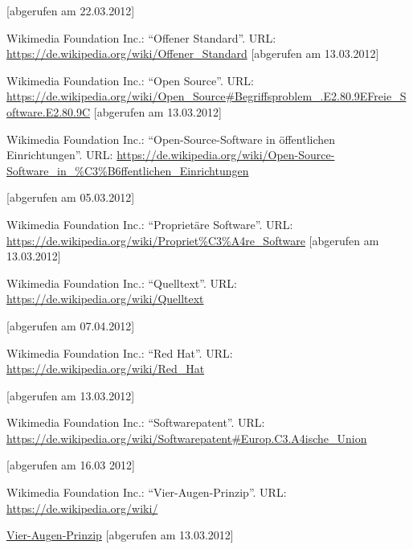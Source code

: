 \documentclass[a4paper]{scrartcl}
\begin{document}
{
{{[abgerufen am 22.03.2012]}}}

{
{{Wikimedia Foundation Inc.:
``Offener Standard''.
URL:}}{{{
}}}\url{https://de.wikipedia.org/wiki/Offener_Standard}{{
}}{[abgerufen am 13.03.2012]}}

{
{{Wikimedia Foundation Inc.:
``Open Source''. URL:
}}\href{https://de.wikipedia.org/wiki/Open_Source#Begriffsproblem_.E2.80.9EFreie_Software.E2.80.9C
}{{https://de.wikipedia.org/wiki/Open\_Source\#Begriffsproblem\_.E2.80.9EFreie\_Software.E2.80.9C}}{{
[abgerufen am 13.03.2012]}}}

{
{{Wikimedia Foundation Inc.:
``Open-Source-Software in öffentlichen
Einrichtungen''.
URL:}}{{{
}}}\href{https://de.wikipedia.org/wiki/Open-Source-Software_in_?ffentlichen_Einrichtungen}{{https://de.wikipedia.org/wiki/Open-Source-Software\_in\_\%C3\%B6ffentlichen\_Einrichtungen}}}

{
{{[abgerufen am 05.03.2012]}}}

{
{{Wikimedia Foundation Inc.:
``Proprietäre Software''. URL:
}}\href{https://de.wikipedia.org/wiki/Propriet?re_Software}{{https://de.wikipedia.org/wiki/Propriet\%C3\%A4re\_Software}}{{
}}{[abgerufen am 13.03.2012]}}

{{{Wikimedia}}{{
}}{{Foundation}}{{
}}{{Inc.:}}{{
``}}{{Quelltext}}{{''}}{{.}}{{
}}{{URL:}}{{
}}\url{https://de.wikipedia.org/wiki/Quelltext}}

{[abgerufen am 07.04.2012]}

{
{{Wikimedia Foundation Inc.:
``Red Hat''. URL:
}}\url{https://de.wikipedia.org/wiki/Red_Hat}}

{
[abgerufen am 13.03.2012]}

{
{{Wikimedia Foundation Inc.:
``Softwarepatent''. URL:
}}\url{https://de.wikipedia.org/wiki/Softwarepatent#Europ.C3.A4ische_Union}}

{
[abgerufen am 16.03 2012]}

{
{{Wikimedia Foundation Inc.:
``Vier-Augen-Prinzip''. URL:
}}\href{https://de.wikipedia.org/wiki/Vier-Augen-Prinzip}{{https://de.wikipedia.org/wiki/}}}

{
\href{https://de.wikipedia.org/wiki/Vier-Augen-Prinzip}{{Vier-Augen-Prinzip}}{{
}}{[abgerufen am 13.03.2012]}}
\end{document}

